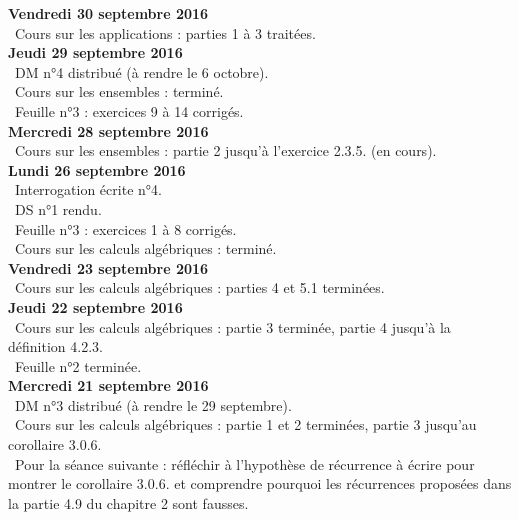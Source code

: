 \documentclass[12pt,a4paper]{article}
\begin{document}
\noindent\textbf{Vendredi 30 septembre 2016}\\
\bu\ Cours sur les applications : parties 1 à 3 traitées. \vspace{.4cm}\\

\noindent\textbf{Jeudi 29 septembre 2016}\\
\bu\ DM n°4 distribué (à rendre le 6 octobre).\\
\bu\ Cours sur les ensembles : terminé.\\
\bu\ Feuille n°3 : exercices 9 à 14 corrigés. \vspace{.4cm}\\


\noindent\textbf{Mercredi 28 septembre 2016}\\
\bu\ Cours sur les ensembles : partie 2 jusqu'à l'exercice 2.3.5. (en cours).\vspace{.4cm}\\


\noindent\textbf{Lundi 26 septembre 2016}\\
\bu\ Interrogation écrite n°4.\\
\bu\ DS n°1 rendu. \\
\bu\ Feuille n°3 : exercices 1 à 8 corrigés. \\
\bu\ Cours sur les calculs algébriques : terminé.\vspace{.4cm}\\

\noindent\textbf{Vendredi 23 septembre 2016}\\
\bu\ Cours sur les calculs algébriques : parties 4  et 5.1 terminées.\vspace{.4cm}\\

\noindent\textbf{Jeudi 22 septembre 2016}\\
\bu\ Cours sur les calculs algébriques : partie 3 terminée, partie 4 jusqu'à la définition 4.2.3.\\
\bu\ Feuille n°2 terminée. \vspace{.4cm}\\

\noindent\textbf{Mercredi 21 septembre 2016}\\
\bu\ DM n°3 distribué (à rendre le 29 septembre). \\
\bu\ Cours sur les calculs algébriques : partie 1 et 2 terminées, partie 3 jusqu'au corollaire 3.0.6.\\
\bu\ Pour la séance suivante : réfléchir à l'hypothèse de récurrence à écrire pour montrer le corollaire 3.0.6. et comprendre pourquoi les récurrences proposées dans la partie 4.9 du chapitre 2 sont fausses. \vspace{.4cm}\\
\end{document}
